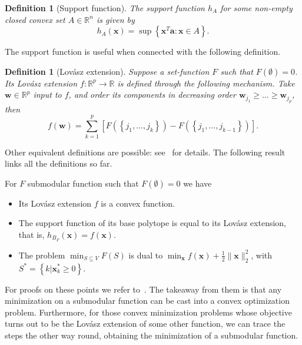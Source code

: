\documentclass[twoside,11pt]{article}
\newcommand{\va}{\bm{a}}       \newcommand{\vah}{\hat{\bm{a}}}        \newcommand{\ah}{\hat{a}}    \newcommand{\vat}{\tilde{\bm{a}}}       \newcommand{\at}{\tilde{a}}
\newcommand{\vw}{\bm{w}}       \newcommand{\vwh}{\hat{\bm{w}}}        \newcommand{\wh}{\hat{w}}    \newcommand{\vwt}{\tilde{\bm{w}}}       \newcommand{\wt}{\tilde{w}}
\newcommand{\vx}{\bm{x}}       \newcommand{\vxh}{\hat{\bm{x}}}        \newcommand{\xh}{\hat{x}}    \newcommand{\vxt}{\tilde{\bm{x}}}       \newcommand{\xt}{\tilde{x}}
\newcommand{\mynorm}[2]{\| {#1} \|_{#2}}
\newcommand{\enorm}[1]{\mynorm{#1}{2}}
\newcommand{\half}{\tfrac{1}{2}}
\newtheorem{defn}[theorem]{Definition}
\numberwithin{equation}{section}
\numberwithin{theorem}{section}
\begin{document}
\begin{defn}[Support function]
  The support function $h_A$ for some non-empty closed convex set $A \in \mathbb{R}^n$ is given by
  \begin{equation*}
   h_A(\vx) = \sup \left\lbrace \vx^T \va : \vx \in A \right\rbrace .
  \end{equation*}
\end{defn}
The support function is useful when connected with the following definition.

\begin{defn}[Lovász extension]
  Suppose a set-function $F$ such that $F(\emptyset) = 0$.
  Its Lovász extension $f: \mathbb{R}^p \rightarrow \mathbb{R}$ is defined through the following mechanism.
  Take $\vw \in \mathbb{R}^p$ input to $f$, and order its components in decreasing order $\vw_{j_1} \geq \ldots \geq \vw_{j_p}$, then
  \begin{equation*}
   f(\vw) = \sum_{k=1}^p [F(\left\lbrace j_1, \ldots, j_k \right\rbrace) -  F(\left\lbrace j_1, \ldots, j_{k-1} \right\rbrace)].
  \end{equation*}
\end{defn}
Other equivalent definitions are possible: see~\citet{Bach13} for details. The following result links all the definitions so far.
\begin{proposition}
  For $F$ submodular function such that $F(\emptyset) = 0$ we have
  \begin{itemize}
   \item Its Lovász extension $f$ is a convex function.
   \item The support function of its base polytope is equal to its Lovász extension, that is, $h_{B_F}(\vx) = f(\vx)$.
   \item The problem $\min_{S \subseteq V} F(S)$ is dual to $\min_{\vx} f(\vx) + \half \enorm{\vx}^2$, with $S^* = \left\lbrace k | \vx_k^* \geq 0 \right\rbrace$.
  \end{itemize}
\end{proposition}
For proofs on these points we refer to~\citet{Bach13}. The takeaway from them is that any minimization on a submodular function can be cast into a convex optimization problem. Furthermore, for those convex minimization problems whose objective turns out to be the Lovász extension of some other function, we can trace the steps the other way round, obtaining the minimization of a submodular function.
\end{document}
